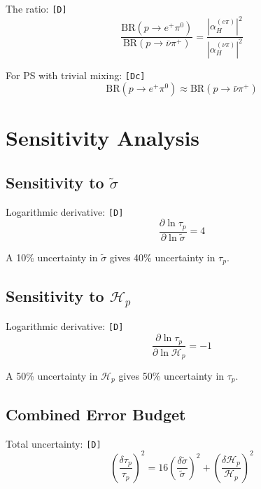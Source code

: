 \documentclass[11pt,a4paper]{article}
\newcommand{\tagD}{\textcolor{green!50!black}{\texttt{[D]}}}
\newcommand{\tagDc}{\textcolor{blue!70!black}{\texttt{[Dc]}}}
\theoremstyle{definition}
\begin{document}
The ratio: \tagD{}
\begin{equation}
\label{eq:br-ratio}
\frac{\text{BR}(p \to e^+ \pi^0)}{\text{BR}(p \to \bar{\nu} \pi^+)} = \frac{|\alpha_H^{(e\pi)}|^2}{|\alpha_H^{(\nu\pi)}|^2}
\end{equation}

For PS with trivial mixing: \tagDc{}
\begin{equation}
\label{eq:br-ratio-value}
\text{BR}(p \to e^+ \pi^0) \approx \text{BR}(p \to \bar{\nu} \pi^+)
\end{equation}

\section{Sensitivity Analysis}
\label{app:sensitivity}

\subsection{Sensitivity to $\tilde{\sigma}$}
\label{app:sens-sigma}

Logarithmic derivative: \tagD{}
\begin{equation}
\label{eq:sens-sigma}
\frac{\partial \ln \tau_p}{\partial \ln \tilde{\sigma}} = 4
\end{equation}

A 10\% uncertainty in $\tilde{\sigma}$ gives 40\% uncertainty in $\tau_p$.

\subsection{Sensitivity to $\mathcal{H}_p$}
\label{app:sens-hp}

Logarithmic derivative: \tagD{}
\begin{equation}
\label{eq:sens-hp}
\frac{\partial \ln \tau_p}{\partial \ln \mathcal{H}_p} = -1
\end{equation}

A 50\% uncertainty in $\mathcal{H}_p$ gives 50\% uncertainty in $\tau_p$.

\subsection{Combined Error Budget}
\label{app:error-budget}

Total uncertainty: \tagD{}
\begin{equation}
\label{eq:total-error}
\left(\frac{\delta \tau_p}{\tau_p}\right)^2 = 16 \left(\frac{\delta \tilde{\sigma}}{\tilde{\sigma}}\right)^2 + \left(\frac{\delta \mathcal{H}_p}{\mathcal{H}_p}\right)^2
\end{equation}
\end{document}
